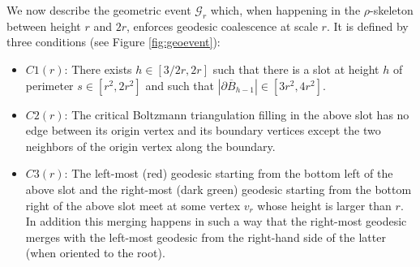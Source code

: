 \documentclass[AHL,XML,longabstracts,Unicode,NoSaveZebib]{cedram}
\begin{document}
We now describe the geometric event $ \mathcal{G}_{r}$ which, when happening in the $\rho$-skeleton between height $r$ and $2r$, enforces geodesic coalescence at scale $r$. It is defined by three conditions (see Figure \ref{fig:geoevent}):
 \begin{itemize}
\item  $C1(r)$: There exists $h \in [3/2 r, 2r]$ such that there is a slot at height $h$ of perimeter $ s \in [r^{2}, 2r^{2}]$ %
and such that $| \partial \overline{B}_{h-1}| \in [3r^{2}, 4r^{2}]$.
\item $C2(r)$: The critical Boltzmann triangulation filling in the above slot has no edge between its origin vertex and its boundary vertices except the two neighbors of the origin vertex along the boundary.
\item $C3(r)$: The left-most (red) geodesic starting from the bottom left of the above slot and the right-most (dark green) geodesic starting from the bottom right of the above slot meet at some vertex $v_{r}$ whose height is larger than $r$. {In addition this merging happens in such a way that the right-most geodesic merges with the left-most geodesic from the right-hand side of the latter (when oriented to the root).}
\end{itemize}
\end{document}
